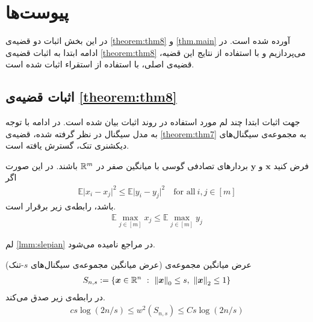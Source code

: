 \chapter{پیوست‌ها}
در این بخش اثبات دو قضیه‌ی
\ref{theorem:thm8}
و 
\ref{thm.main}
آورده شده است. در ادامه ابتدا به اثبات قضیه‌ی
\ref{theorem:thm8}
می‌پردازیم و با استفاده از نتایج این قضیه، قضیه‌ی اصلی، با استفاده از استقراء اثبات شده است. 
\section{اثبات قضیه‌ی
\ref{theorem:thm8}}
\label{Appndx1}
جهت اثبات ابتدا چند لم مورد استفاده در روند اثبات بیان شده است. در ادامه با توجه به مدل سیگنال در نظر گرفته شده،‌ قضیه‌ی 
\ref{theorem:thm7}
به مجموعه‌ی سیگنال‌های دیکشنری تنک، گسترش یافته است.
\begin{lemma}
\cite[لم~8.25]{foucart2013mathematical}
\label{lmm:slepian}
فرض کنید 
$\bm{x}$
و
$\bm{y}$
بردار‌های تصادفی گوسی با میانگین صفر در
$\mathbb{R}^{m}$
باشند. در این صورت اگر
\begin{align}
\label{eq:slep1}
\mathbb{E}\vert x_{i}-x_{j} \vert^{2} \leq \mathbb{E}\vert y_{i}-y_{j} \vert^{2} \quad \text{for all}~ i,j\in [m]
\end{align}
باشد، رابطه‌ی زیر برقرار است.
\begin{align}
\label{eq:slep2}
\mathbb{E} \max_{j\in [m]} x_{j} \leq \mathbb{E} \max_{j\in [m]} y_{j} 
\end{align}
\end{lemma}

لم
\ref{lmm:slepian}
در مراجع
نامیده می‌شود.

\begin{lemma}
\label{lmm:SparsW}
\cite[لم~2.3]{plan2013robust}
(عرض میانگین مجموعه‌ی سیگنال‌های 
$s$-تنک)
عرض میانگین مجموعه‌ی
\begin{align}
\label{eq:SparsW1}
S_{n,s} := \lbrace \bm{x} \in \mathbb{R}^{n}~:~\left\lVert\bm{x}\right\rVert_{0}\leq s,~\left\lVert\bm{x}\right\rVert_{2}\leq 1\rbrace
\end{align}
در رابطه‌ی زیر صدق می‌کند.
\begin{align}
\label{eq:SparsW2}
cs \log\left(2n/s\right)\leq \mathit{w}^{2}\left(S_{n,s}\right)\leq Cs \log\left(2n/s\right)
\end{align}
\end{lemma}	

